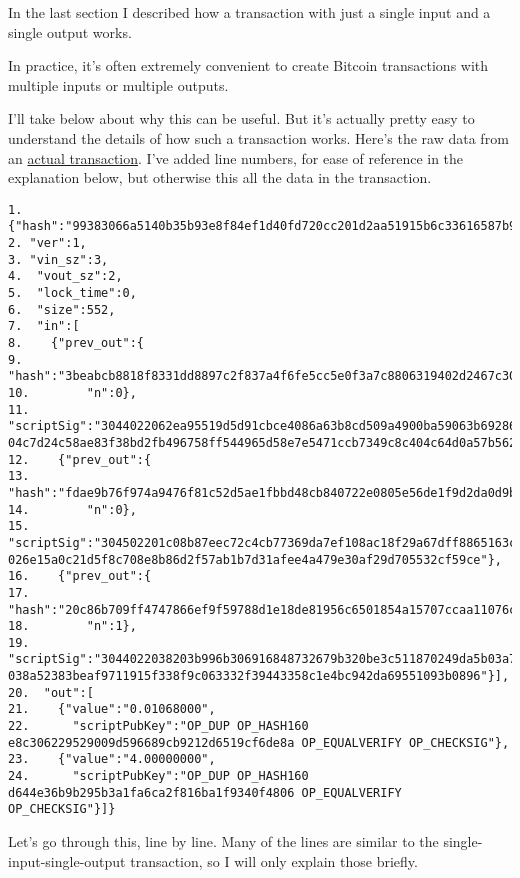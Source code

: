 \documentclass[12pt]{book}
\newcommand{\link}[2]{\href{#1}{#2}}
\begin{document}
In the last section I described how a transaction with just a single
input and a single output works.

In practice, it's often extremely convenient to create Bitcoin
transactions with multiple inputs or multiple outputs.

I'll take below about why this can be useful.  But it's actually
pretty easy to understand the details of how such a transaction works.
Here's the raw data from an
\link{http://blockexplorer.com/tx/99383066a5140b35b93e8f84ef1d40fd720cc201d2aa51915b6c33616587b94f}{actual
  transaction}.  I've added line numbers, for ease of reference in the
explanation below, but otherwise this all the data in the transaction.

\begin{Verbatim}[fontsize=\small]
1. {"hash":"99383066a5140b35b93e8f84ef1d40fd720cc201d2aa51915b6c33616587b94f",
2. "ver":1,
3. "vin_sz":3,
4.  "vout_sz":2,
5.  "lock_time":0,
6.  "size":552,
7.  "in":[
8.    {"prev_out":{
9.      "hash":"3beabcb8818f8331dd8897c2f837a4f6fe5cc5e0f3a7c8806319402d2467c30a",
10.        "n":0},
11.     "scriptSig":"3044022062ea95519d5d91cbce4086a63b8cd509a4900ba59063b69286236527e31a228e022076de59315406b7ec3a7414c98b5d32f47d11b9a786d31cf44883f3fb5812aa4001 04c7d24c58ae83f38bd2fb496758ff544965d58e7e5471ccb7349c8c404c64d0a57b562a20dfdcf152e0a401473ba520e387bf2516a4841a5f5bf5701b6fc09552"},
12.    {"prev_out":{
13.        "hash":"fdae9b76f974a9476f81c52d5ae1fbbd48cb840722e0805e56de1f9d2da0d9bc",
14.        "n":0},
15.      "scriptSig":"304502201c08b87eec72c4cb77369da7ef108ac18f29a67dff8865163cac3b155a0e9bf4022100afd61ce024ed33c4eee5e2f5cbc13203527a3b708f14c9573943132c061f800301 026e15a0c21d5f8c708e8b86d2f57ab1b7d31afee4a479e30af29d705532cf59ce"},
16.    {"prev_out":{
17.        "hash":"20c86b709ff4747866ef9f59788d1e18de81956c6501854a15707ccaa11076ce",
18.        "n":1},
19.      "scriptSig":"3044022038203b996b306916848732679b320be3c511870249da5b03a719f5a1f39cf646022070fd8c34a6ff73ebc8272e5ba717b9d3ef7100846bdbe4049808683d475d478001 038a52383beaf9711915f338f9c063332f39443358c1e4bc942da69551093b0896"}],
20.  "out":[
21.    {"value":"0.01068000",
22.      "scriptPubKey":"OP_DUP OP_HASH160 e8c306229529009d596689cb9212d6519cf6de8a OP_EQUALVERIFY OP_CHECKSIG"},
23.    {"value":"4.00000000",
24.      "scriptPubKey":"OP_DUP OP_HASH160 d644e36b9b295b3a1fa6ca2f816ba1f9340f4806 OP_EQUALVERIFY OP_CHECKSIG"}]}
\end{Verbatim}

Let's go through this, line by line.  Many of the lines are similar to
the single-input-single-output transaction, so I will only explain
those briefly.
\end{document}
